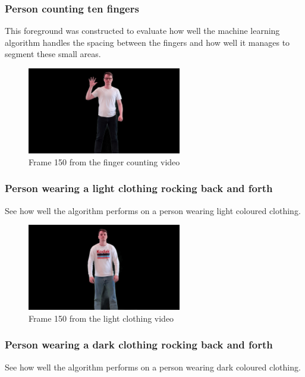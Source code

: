 \subsubsection{Person counting ten fingers}
This foreground was constructed to evaluate how well the machine learning algorithm handles the spacing between the fingers and how well it manages to segment these small areas.

\begin{figure}[H]
    \centering
    \includegraphics[width=0.6\textwidth]{img/video_frame_150/FG_Counting-Fingers_150.jpg}
    \caption{Frame 150 from the finger counting video}
    \label{fig:foreground_counting}
\end{figure}


\subsubsection{Person wearing a light clothing rocking back and forth}
See how well the algorithm performs on a person wearing light coloured clothing.

\begin{figure}[H]
    \centering
    \includegraphics[width=0.6\textwidth]{img/video_frame_150/FG_Rocking-Light_150.jpg}
    \caption{Frame 150 from the light clothing video}
    \label{fig:foreground_light_clothing}
\end{figure}


\subsubsection{Person wearing a dark clothing rocking back and forth}
See how well the algorithm performs on a person wearing dark coloured clothing.


